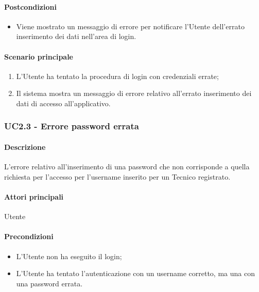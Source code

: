 \paragraph*{Postcondizioni}
\begin{itemize}
  \item Viene mostrato un messaggio di errore per notificare l’Utente dell’errato inserimento dei dati nell’area di login.
\end{itemize}

\paragraph*{Scenario principale}
\begin{enumerate}
  \item L’Utente ha tentato la procedura di login con credenziali errate;
  \item Il sistema mostra un messaggio di errore relativo all’errato inserimento dei dati di accesso all’applicativo.    
\end{enumerate}



\subsubsection{UC2.3 - Errore password errata}\label{UC2point3}
\paragraph*{Descrizione}
L’errore relativo all'inserimento di una password che non corrisponde a quella richiesta per l'accesso per l'username inserito per un Tecnico registrato.

\paragraph*{Attori principali}
Utente

\paragraph*{Precondizioni}
\begin{itemize}
  \item L’Utente non ha eseguito il login;
  \item L’Utente ha tentato l’autenticazione con un username corretto, ma una con una password errata.  
\end{itemize}

